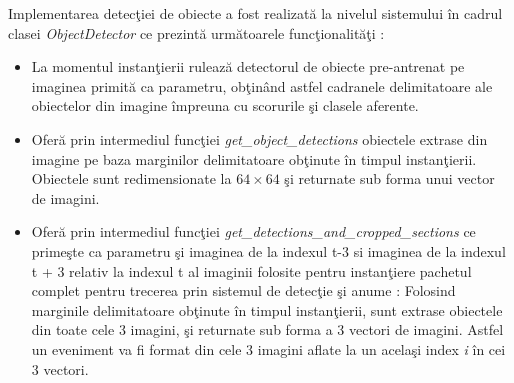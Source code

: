 \documentclass[a4paper,12pt]{report}
\begin{document}
\par Implementarea detecţiei de obiecte a fost realizată la nivelul sistemului în cadrul clasei \emph{ObjectDetector} ce prezintă următoarele funcţionalităţi :
\begin{itemize}
\item La momentul instanţierii rulează detectorul de obiecte pre-antrenat pe imaginea primită ca parametru, obţinând astfel cadranele delimitatoare ale obiectelor din imagine împreuna cu scorurile şi clasele aferente. 
\item Oferă prin intermediul funcţiei \emph{get\_object\_detections} obiectele extrase din imagine pe baza marginilor delimitatoare obţinute în timpul instanţierii. Obiectele sunt redimensionate la \( 64 \times 64\) şi returnate sub forma unui vector de imagini.
\item Oferă prin intermediul funcţiei \emph{get\_detections\_and\_cropped\_sections} ce primeşte ca parametru şi imaginea de la indexul t-3 si imaginea de la indexul t + 3 relativ la indexul t  al imaginii folosite pentru instanţiere pachetul complet pentru trecerea prin sistemul de detecţie şi anume : Folosind marginile delimitatoare obţinute în timpul instanţierii, sunt extrase obiectele din toate cele 3 imagini, şi returnate sub forma a 3 vectori de imagini. Astfel un eveniment va fi format din cele 3 imagini aflate la un acelaşi index \emph{i} în cei 3 vectori. 

\end{itemize}
\end{document}
